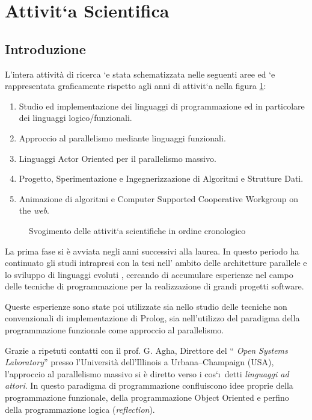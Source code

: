 \documentclass[11pt]{article}
\newlength{\figwidth}
\begin{document}
\section{Attivit\a`a Scientifica}

\subsection{Introduzione}
L'intera attivit\`a di ricerca \a`e stata schematizzata nelle
seguenti aree ed \a`e rappresentata graficamente rispetto agli anni di
attivit\a`a nella figura \ref{schema}:

\begin{enumerate}
\item Studio ed implementazione dei linguaggi di programmazione ed in
particolare dei linguaggi logico/funzionali.

\item Approccio al parallelismo mediante linguaggi funzionali.

\item Linguaggi Actor Oriented per il parallelismo massivo.

\item Progetto, Sperimentazione e Ingegnerizzazione di Algoritmi e
Strutture Dati.

\item Animazione di algoritmi e Computer Supported Cooperative
Workgroup on the {\sl web}.
\end{enumerate}

\begin{figure}[h]
  \caption{Svogimento delle attivit\a`a scientifiche in ordine cronologico}
\label{schema}
\end{figure}
  
  
La prima fase si \`e avviata negli anni successivi alla laurea.  In
questo periodo ha continuato gli studi intrapresi con la tesi nell'
ambito delle architetture parallele e lo sviluppo di linguaggi evoluti
\cite{ipl:1,icon:2}, cercando di accumulare esperienze nel campo delle
tecniche di programmazione per la realizzazione di grandi progetti
software.

Queste esperienze sono state poi utilizzate sia nello studio delle
tecniche  non convenzionali di implementazione di Prolog, sia
nell'utilizzo  del paradigma della programmazione
funzionale come approccio al parallelismo.

Grazie a ripetuti contatti con il prof. G. Agha, Direttore del ``{\sl
Open Systems Laboratory}'' presso l'Universit\`a dell'Illinois a
Urbana--Champaign (USA), l'approccio al parallelismo massivo si \`e
diretto verso i cos\a`\i\ detti  {\sl linguaggi ad attori}.  In
questo paradigma di programmazione confluiscono idee proprie della
programmazione funzionale, della programmazione Object Oriented e
perfino della programmazione logica ({\sl reflection}).
\end{document}
